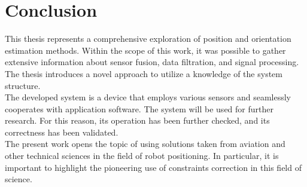 \chapter{Conclusion}

This thesis represents a comprehensive exploration of position and orientation estimation methods. Within the scope of this work, it was possible to gather extensive information about sensor fusion, data filtration, and signal processing. The thesis introduces a novel approach to utilize a knowledge of the system structure.\\

The developed system is a device that employs various sensors and seamlessly cooperates with application software. The system will be used for further research. For this reason, its operation has been further checked, and its correctness has been validated.\\

The present work opens the topic of using solutions taken from aviation and other technical sciences in the field of robot positioning. In particular, it is important to highlight the pioneering use of constraints correction in this field of science.




